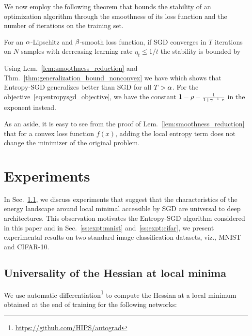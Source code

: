 \documentclass[10pt]{article}
\newcommand{\entropysgd}{\mathrm{Entropy}\textrm{-}\mathrm{SGD}}
\begin{document}
We now employ the following theorem that bounds the stability of an optimization algorithm through the smoothness of its loss function and the number of iterations on the training set.
\begin{theorem}
\label{thm:generalization_bound_nonconvex}
For an $\alpha$-Lipschitz and $\beta$-smooth loss function, if SGD converges in $T$ iterations on $N$ samples with decreasing learning rate $\eta_t \leq 1/t$ the stability is bounded by
\end{theorem}
%
Using Lem.~\ref{lem:smoothness_reduction} and Thm.~\ref{thm:generalization_bound_nonconvex} we have
\beq{
    \e_{\ \entropysgd} \lessapprox \rbrac{\a\ T^{-1}}^{\rbrac{1 - \f{1}{1 + \g^{-1}c}}\ \b}\ \e_{\ \textrm{SGD}},
    \label{eq:stability_bound}
}
which shows that $\entropysgd$ generalizes better than SGD for all $T > \alpha$. For the objective~\eqref{eq:entropysgd_objective}, we have the constant $1 - \rho - \frac{1}{1 + \gamma^{-1}\ c}$ in the exponent instead.

As an aside, it is easy to see from the proof of Lem.~\ref{lem:smoothness_reduction} that for a convex loss function $f(x)$, adding the local entropy term does not change the minimizer of the original problem.
 
\section{Experiments}
\label{s:expt}

In Sec.~\ref{ss:expt:universality}, we discuss experiments that suggest that the characteristics of the energy landscape around local minimal accessible by SGD are universal to deep architectures.  This observation motivates the $\entropysgd$ algorithm considered in this paper and in Sec.~\ref{ss:expt:mnist} and~\ref{ss:expt:cifar}, we present experimental results on two standard image classification datasets, viz., MNIST and CIFAR-10.

\subsection{Universality of the Hessian at local minima}
\label{ss:expt:universality}

We use automatic differentiation\footnote{\href{https://github.com/HIPS/autograd}{https://github.com/HIPS/autograd}} to compute the Hessian at a local minimum obtained at the end of training for the following networks:
\end{document}
